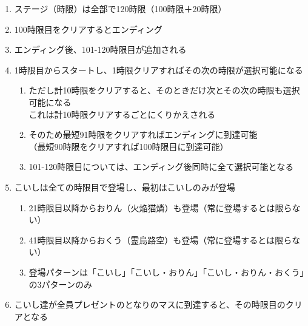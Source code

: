 \clearpage
\begin{enumerate}[label={\sarrow}]
\item ステージ（時限）は全部で120時限（100時限＋20時限）
\item 100時限目をクリアするとエンディング
\item エンディング後、101-120時限目が追加される
\item 1時限目からスタートし、1時限クリアすればその次の時限が選択可能になる
  \begin{enumerate}[label={\sarrow}]
  \item ただし計10時限をクリアすると、そのときだけ次とその次の時限も選択可能になる\\
        これは計10時限クリアするごとにくりかえされる
  \item そのため最短91時限をクリアすればエンディングに到達可能\\
        （最短90時限をクリアすれば100時限目に到達可能）
  \item 101-120時限目については、エンディング後同時に全て選択可能となる
  \end{enumerate}
\item こいしは全ての時限目で登場し、最初はこいしのみが登場
  \begin{enumerate}[label={\sarrow}]
  \item 21時限目以降からおりん（火焔猫燐）も登場（常に登場するとは限らない）
  \item 41時限目以降からおくう（霊烏路空）も登場（常に登場するとは限らない）
  \item 登場パターンは「こいし」「こいし・おりん」「こいし・おりん・おくう」の3パターンのみ
  \end{enumerate}
\item こいし達が全員プレゼントのとなりのマスに到達すると、その時限目のクリアとなる
\end{enumerate}






